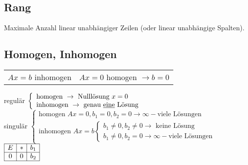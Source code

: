 \subsection{Rang}
	Maximale Anzahl linear unabhängiger Zeilen (oder linear unabhängige Spalten).

\subsection{Homogen, Inhomogen}
	\begin{tabular}{ll}
		$Ax = b$ inhomogen & $Ax = 0$ homogen $\rightarrow b=0$\\
	\end{tabular}

	regulär $\left\lbrace\begin{array}{l}
		\text{homogen } \rightarrow \text{ Nulllösung } x=0\\
		\text{inhomogen } \rightarrow \text{ genau \underline{eine} Lösung }\end{array}\right.$ \\
	
	singulär $\left\lbrace\begin{array}{l}
		\text{homogen } Ax=0, b_1=0, b_2=0 \rightarrow \infty-\text{viele Lösungen}\\
		\text{inhomogen } Ax = b \left\lbrace\begin{array}{l}
			b_1 \neq 0, b_2 \neq 0 \rightarrow \text{ keine Lösung}\\
			b_1 \neq 0, b_2 =0 \rightarrow \infty-\text{viele Lösungen} \end{array}\right. \end{array}\right.$ \qquad 
		$ \begin{array}{|c | c|c|}
			\hline E & * & b_1 \\
			\hline 
			0 & 0 & b_2 \\
			\hline \end{array}$ \\

